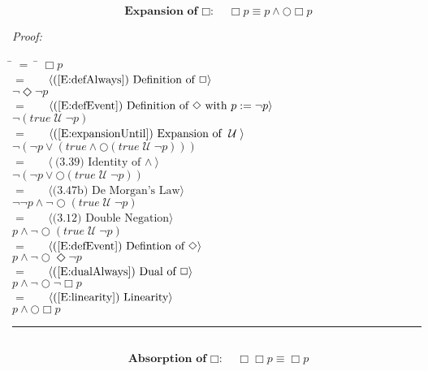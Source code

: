 \documentclass[fleqn, leqno]{article}
\newcommand{\lgap}{2pt}                             %
\newcommand{\mymathindent}{24pt}                      %
\newcommand{\until}{\;\mathcal{U}\;}
\newcommand{\next}{\bigcirc}
\newcommand{\event}{\Diamond}
\newcommand{\always}{\Box}
\newcommand{\myqed}{\hfill\rule[-.23ex]{1.2ex}{2.0ex}}
\newcommand{\Gll} {\langle}                         %
\newcommand{\Ggg} {\rangle}                         %
\newcommand{\Hint}[1]     {\ \ \ $\Gll              \mbox{#1} \Ggg$ }   %
\begin{document}
\begin{equation}\label{E:expansionAlways}
\textbf{Expansion of $\always$:}\quad \always p \equiv p \land \next\always p
\end{equation}

\emph{Proof:}
\begin{tabbing}
\hspace{\mymathindent} \= $= \;$ \= \kill
  \> \>   $\always p$\\[\lgap]
  \> $=$  \>  \Hint{(\ref{E:defAlways}) Definition of $\always$}\\[\lgap]
  \> \>   $\lnot\event\lnot p$\\[\lgap]
  \> $=$  \>  \Hint{(\ref{E:defEvent}) Definition of $\event$ with $p := \lnot p$}\\[\lgap]
  \> \>   $\lnot(true \until \lnot p)$\\[\lgap]
  \> $=$  \>  \Hint{(\ref{E:expansionUntil}) Expansion of $\until$}\\[\lgap]
  \> \>   $\lnot(\lnot p \lor (true \land \next(true \until \lnot p)))$\\[\lgap]
  \> $=$  \>  \Hint{(3.39) Identity of $\land$}\\[\lgap]
  \> \>   $\lnot(\lnot p \lor \next(true \until \lnot p))$\\[\lgap]
  \> $=$  \>  \Hint{(3.47b) De Morgan's Law}\\[\lgap]
  \> \>   $\lnot\lnot p \land \lnot\next(true \until \lnot p)$\\[\lgap]
  \> $=$  \>  \Hint{(3.12) Double Negation}\\[\lgap]
  \> \>   $p \land \lnot\next(true \until \lnot p)$\\[\lgap]
  \> $=$  \>  \Hint{(\ref{E:defEvent}) Defintion of $\event$}\\[\lgap]
  \> \>   $p \land \lnot\next\event\lnot p$\\[\lgap]
  \> $=$  \>  \Hint{(\ref{E:dualAlways}) Dual of $\always$}\\[\lgap]
  \> \>   $p \land \lnot\next\lnot\always p$\\[\lgap]
  \> $=$  \>  \Hint{(\ref{E:linearity}) Linearity}\\[\lgap]
  \> \>   $p \land \next\always p$\\[\lgap]
\end{tabbing}
\myqed\\[\lgap]


\begin{equation}\label{E:IdemAlways}
\textbf{Absorption of $\always$:}\quad \always\always p \equiv \always p
\end{equation}
\end{document}
